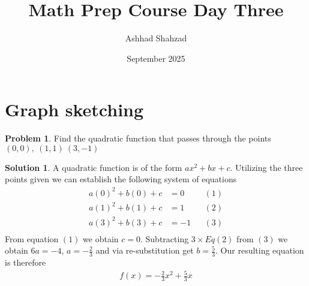 \documentclass[a4paper]{article}
\title{Math Prep Course Day Three}
\author{Ashhad Shahzad}
\date{September 2025}
\theoremstyle{definition}
\newtheorem{problem}{Problem}[section]
\newtheorem*{solution}{Solution}
\begin{document}
\maketitle

\section{Graph sketching}

\begin{problem}
Find the quadratic function that passes through the points \((0,0),\ (1,1)\ (3, -1)\)
\end{problem}
\begin{solution}
A quadratic function is of the form \(ax^2 + bx + c\). Utilizing the three points given we can establish the following system of equations
\begin{align*}
a(0)^2 + b(0) + c &= 0 && (1)\\
a(1)^2 + b(1) + c &= 1 && (2)\\
a(3)^2 + b(3) + c &= -1 && (3)\\
\end{align*}
From equation \((1)\) we obtain \(c=0\). Subtracting \(3 \times Eq(2)\) from \((3)\) we obtain \(6a = -4\), \(a=-\frac{2}{3}\) and via re-substitution get \(b= \frac{5}{3}\). Our resulting equation is therefore
\begin{align*}
f(x) =-\frac{2}{3}x^2 + \frac{5}{3}x\\
\end{align*}

\end{solution}
\end{document}
